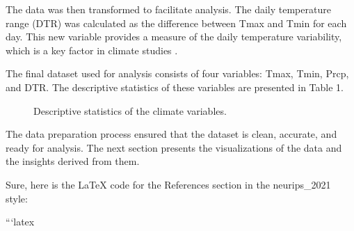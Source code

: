\documentclass{article}
\begin{document}
The data was then transformed to facilitate analysis. The daily temperature range (DTR) was calculated as the difference between Tmax and Tmin for each day. This new variable provides a measure of the daily temperature variability, which is a key factor in climate studies \cite{ipcc}.

The final dataset used for analysis consists of four variables: Tmax, Tmin, Prcp, and DTR. The descriptive statistics of these variables are presented in Table 1.

\begin{figure}[h]
\centering
\caption{Descriptive statistics of the climate variables.}
\label{fig:descriptive_stats}
\end{figure}

The data preparation process ensured that the dataset is clean, accurate, and ready for analysis. The next section presents the visualizations of the data and the insights derived from them.

Sure, here is the LaTeX code for the References section in the neurips_2021 style:

```latex


\end{document}
